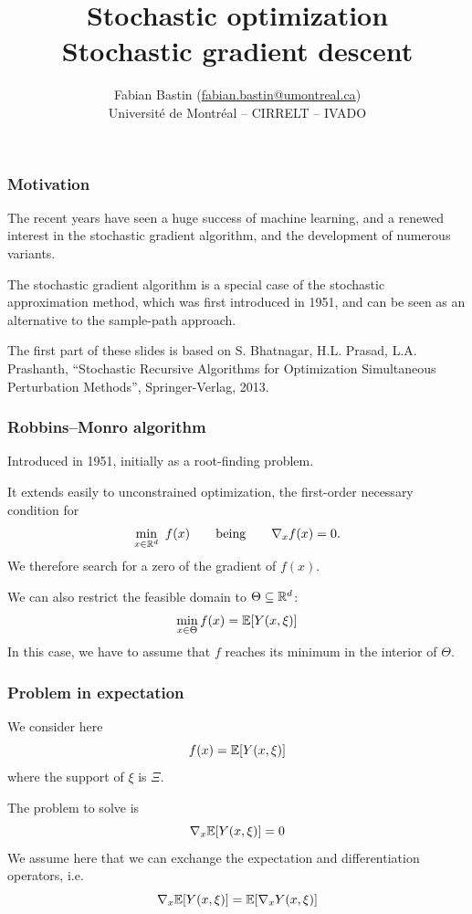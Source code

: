\documentclass[usepdftitle=false, aspectratio=169]{beamer}
\title[SA vs SAA]{Stochastic optimization\\Stochastic gradient descent}
\author[Fabian Bastin]{Fabian Bastin (\url{fabian.bastin@umontreal.ca}) \\ Université de Montréal -- CIRRELT -- IVADO}
\date{}
\begin{document}

\frame{\titlepage}

\begin{frame}
\frametitle{Motivation}

The recent years have seen a huge success of machine learning, and a renewed interest in the stochastic gradient algorithm, and the development of numerous variants.

\mbox{}

The stochastic gradient algorithm is a special case of the stochastic approximation method, which was first introduced in 1951, and can be seen as an alternative to the sample-path approach.

\mbox{}

The first part of these slides is based on
S. Bhatnagar, H.L. Prasad, L.A. Prashanth, ``Stochastic Recursive Algorithms for Optimization
Simultaneous Perturbation Methods'', Springer-Verlag, 2013.

\end{frame}

\begin{frame}
\frametitle{Robbins–Monro algorithm}

Introduced in 1951, initially as a root-finding problem.

\mbox{}

It extends easily to unconstrained optimization, the first-order necessary condition for
$$
\min_{x \in {\mathbb{R}}^d} \ f(x)
\qquad \text{being} \qquad
\nabla_x f(x) = 0 .
$$
We therefore search for a zero of the gradient of $f(x)$.

\mbox{}

We can also restrict the feasible domain to $\Theta \subseteq {\mathbb{R}}^d$:
$$
\min_{x \in \Theta} f(x) = {\mathbb{E}}[Y(x,\xi)]
$$
In this case, we have to assume that $f$ reaches its minimum in the interior of $\Theta$.

\end{frame}

\begin{frame}
\frametitle{Problem in expectation}

We consider here
$$
f(x) = {\mathbb{E}}[Y(x,\xi)]
$$
where the support of $\xi$ is $\Xi$.

\mbox{}

The problem to solve is
$$
\nabla_x {\mathbb{E}}[Y(x,\xi)] = 0
$$
We assume here that we can exchange the expectation and differentiation operators, i.e.
$$
\nabla_x {\mathbb{E}}[Y(x,\xi)] = {\mathbb{E}}[\nabla_x Y(x,\xi)]
$$

\end{frame}
\end{document}
